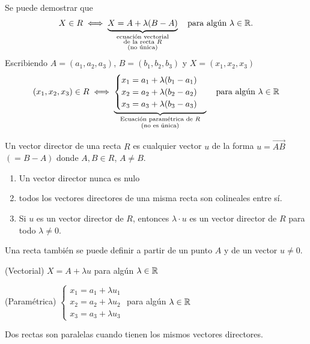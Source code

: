 \documentclass[11pt,a4paper]{article}
\begin{document}
Se puede demostrar que
\[
X\in R\iff\underbrace{X=A+\lambda(B-A)}_{\substack{\text{ecuación vectorial}\\\text{de la recta } R\\\text{(no única)}}}\quad\text{para algún }\lambda\in\mathbb{R}.
\]
Escribiendo $A=(a_1,a_2,a_3)$, $B=(b_1,b_2,b_3)$ y $X=(x_1,x_2,x_3)$
\[
(x_1,x_2,x_3)\in R\iff
\underbrace{\begin{cases}
x_1=a_1+\lambda(b_1-a_1)\\
x_2=a_2+\lambda(b_2-a_2)\\
x_3=a_3+\lambda(b_3-a_3)
\end{cases}}_{\substack{\text{Ecuación paramétrica de } R\\\text{(no es única)}}}
\quad\text{para algún }\lambda\in\mathbb{R}
\]


\begin{definicion}
Un vector director de una recta $R$ es cualquier vector $u$ de la forma $u=\overrightarrow{AB}$ $(=B-A)$ donde $A,B\in R$, $A\neq B$.
\end{definicion}

\begin{observacion}\leavevmode
\begin{enumerate}[label=(\arabic*)]
  \item Un vector director nunca es nulo
  \item todos los vectores directores de una misma recta son colineales entre sí.
  \item Si $u$ es un vector director de $R$, entonces $\lambda\cdot u$ es un vector director de $R$ para todo $\lambda\neq0$.
\end{enumerate}
\end{observacion}

\begin{observacion}
Una recta también se puede definir a partir de un punto $A$ y de un vector $u\neq0$.

(Vectorial) \quad $X=A+\lambda u$ \quad para algún $\lambda\in\mathbb{R}$

(Paramétrica)
$\begin{cases}
x_1=a_1+\lambda u_1\\
x_2=a_2+\lambda u_2\\
x_3=a_3+\lambda u_3
\end{cases}$
\quad para algún $\lambda\in\mathbb{R}$
\end{observacion}

\begin{definicion}
Dos rectas son paralelas cuando tienen los mismos vectores directores.
\end{definicion}
\end{document}
